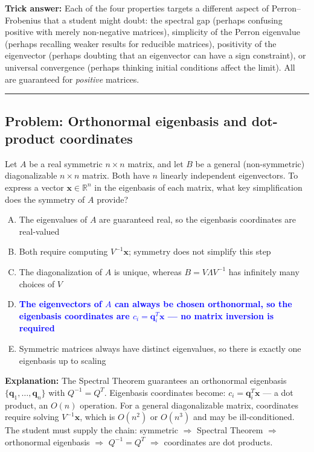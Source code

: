 \documentclass[12pt]{amsart}
\newcommand{\divider}{
  \vspace{-1em}
  \noindent
  \raisebox{-0.15ex}{\textbullet}%
  \hspace{0.5em}%
  \rule[0.5ex]{0.95\textwidth}{1.0pt}%
  \hspace{0.5em}%
  \raisebox{-0.15ex}{\textbullet}%
  \vspace{0em}
}
\begin{document}
\textbf{Trick answer:}
Each of the four properties targets a different aspect of Perron--Frobenius
that a student might doubt:
the spectral gap (perhaps confusing positive with merely non-negative
matrices), simplicity of the Perron eigenvalue (perhaps recalling weaker
results for reducible matrices), positivity of the eigenvector (perhaps
doubting that an eigenvector can have a sign constraint), or universal
convergence (perhaps thinking initial conditions affect the limit).
All are guaranteed for \emph{positive} matrices.

\divider

\subsection*{Problem: Orthonormal eigenbasis and dot-product coordinates}

Let $A$ be a real symmetric $n \times n$ matrix, and let $B$ be a general
(non-symmetric) diagonalizable $n \times n$ matrix. Both have $n$ linearly
independent eigenvectors. To express a vector $\mathbf{x} \in \mathbb{R}^n$
in the eigenbasis of each matrix, what key simplification does the symmetry
of $A$ provide?

\begin{enumerate}[(A)]
\item The eigenvalues of $A$ are guaranteed real, so the eigenbasis
      coordinates are real-valued
\item Both require computing $V^{-1}\mathbf{x}$; symmetry does not
      simplify this step
\item The diagonalization of $A$ is unique, whereas $B = V\Lambda V^{-1}$
      has infinitely many choices of $V$
\item \textcolor{blue}{\textbf{The eigenvectors of $A$ can always be
      chosen orthonormal, so the eigenbasis coordinates are
      $c_i = \mathbf{q}_i^T\mathbf{x}$ --- no matrix inversion is
      required}}
\item Symmetric matrices always have distinct eigenvalues, so there is
      exactly one eigenbasis up to scaling
\end{enumerate}

\textbf{Explanation:}
The Spectral Theorem guarantees an orthonormal eigenbasis
$\{\mathbf{q}_1, \ldots, \mathbf{q}_n\}$ with $Q^{-1} = Q^T$.
Eigenbasis coordinates become:
$c_i = \mathbf{q}_i^T\mathbf{x}$ --- a dot product, an $O(n)$ operation.
For a general diagonalizable matrix, coordinates require solving
$V^{-1}\mathbf{x}$, which is $O(n^2)$ or $O(n^3)$ and may be
ill-conditioned. The student must supply the chain:
symmetric $\Rightarrow$ Spectral Theorem $\Rightarrow$ orthonormal
eigenbasis $\Rightarrow$ $Q^{-1} = Q^T$ $\Rightarrow$ coordinates are
dot products.
\end{document}
